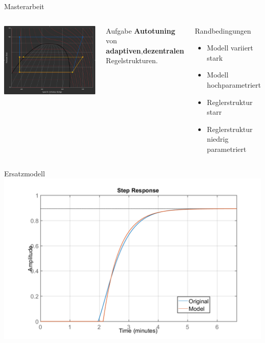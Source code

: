 \documentclass[fleqn,11pt,aspectratio=43]{beamer}
\begin{document}
\begin{frame}{Masterarbeit}
\begin{columns}[onlytextwidth]
\centering
\includegraphics[width=\textwidth]{Prozess}
\begin{alertblock}{Aufgabe}
		\textbf{Autotuning} von \textbf{adaptiven},\textbf{dezentralen} Regelstrukturen.
	\end{alertblock}
	\begin{exampleblock}{Randbedingungen}
		\begin{itemize}
			\item Modell variiert stark
			\item Modell hochparametriert
			\item Reglerstruktur starr
			\item Reglerstruktur niedrig parametriert
		\end{itemize}
	\end{exampleblock}
  \end{columns}
\end{frame}

\begin{frame}{Ersatzmodell}
\centering
\includegraphics[width=\textwidth]{FOTD}
\end{frame}
\end{document}
